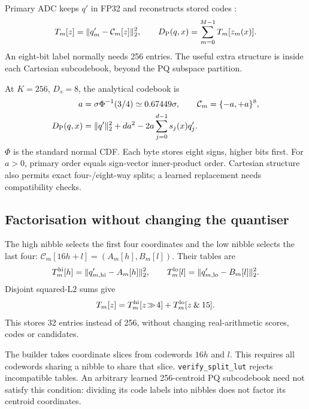 Primary ADC keeps $q'$ in FP32 and reconstructs stored codes \cite{pq,jhq}:
\begin{equation}
 T_m[z]=\|q'_m-\mathcal C_m[z]\|_2^2,\qquad
 D_{\mathrm{P}}(q,x)=\sum_{m=0}^{M-1}T_m[z_m(x)].
 \label{eq:5-primary-lut}
\end{equation}
An eight-bit label normally needs 256 entries. The useful extra structure is inside each Cartesian subcodebook, beyond the PQ subspace partition.

At $K=256$, $D_s=8$, the analytical codebook is
\begin{equation}
 \begin{aligned}
 a&=\sigma\Phi^{-1}(3/4)\simeq0.67449\sigma,\qquad
 \mathcal C_m=\{-a,+a\}^{8},\\
 D_{\mathrm{P}}(q,x)&=\|q'\|_2^2+da^2
       -2a\sum_{j=0}^{d-1}s_j(x)q'_j.
 \end{aligned}
 \label{eq:5-sign-codebook}
\end{equation}
$\Phi$ is the standard normal CDF. Each byte stores eight signs, higher bits first. For $a>0$, primary order equals sign-vector inner-product order. Cartesian structure also permits exact four-/eight-way splits; a learned replacement needs compatibility checks.

\subsection{Factorisation without changing the quantiser}

The high nibble selects the first four coordinates and the low nibble selects the last four: $\mathcal C_m[16h+l]=(A_m[h],B_m[l])$. Their tables are
\begin{equation}
 T_m^{\rm hi}[h]=\|q'_{m,\rm hi}-A_m[h]\|_2^2,\qquad
 T_m^{\rm lo}[l]=\|q'_{m,\rm lo}-B_m[l]\|_2^2.
 \label{eq:5-lut-halves}
\end{equation}
Disjoint squared-L2 sums give
\begin{equation}
 T_m[z]=T_m^{\rm hi}[z\!\gg\!4]
        +T_m^{\rm lo}[z\mathbin{\&}15].
 \label{eq:5-lut-factorisation}
\end{equation}
This stores 32 entries instead of 256, without changing real-arithmetic scores, codes or candidates.

The builder takes coordinate slices from codewords $16h$ and $l$. This requires all codewords sharing a nibble to share that slice. \texttt{verify\_split\_lut} rejects incompatible tables.
An arbitrary learned 256-centroid PQ subcodebook need not satisfy this
condition: dividing its code labels into nibbles does not factor its
centroid coordinates.

